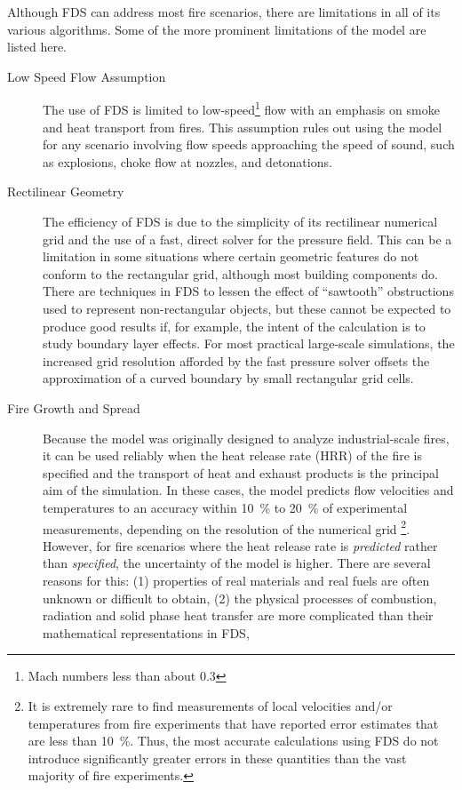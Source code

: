 \documentclass[11pt]{book}
\begin{document}
Although FDS can address most fire scenarios, there are limitations in all of its various algorithms. Some of the more prominent limitations of the
model are listed here. 
\begin{description}
\item[Low Speed Flow Assumption] The use of FDS is limited to low-speed\footnote{Mach numbers less than about 0.3} flow
with an emphasis on smoke and heat transport from fires. This assumption rules out using the model for any scenario involving flow speeds approaching
the speed of sound, such as explosions, choke flow at nozzles, and detonations.
\item[Rectilinear Geometry] The efficiency of FDS is due to the simplicity of its rectilinear numerical grid and the
use of a fast, direct solver for the pressure field. This can be a limitation in some situations where certain geometric features do not conform to
the rectangular grid, although most building components do. There are techniques in FDS to lessen the effect of ``sawtooth'' obstructions used to
represent non-rectangular objects, but these cannot be expected to produce good results if, for example, the intent of the calculation is to study
boundary layer effects. For most practical large-scale simulations, the increased grid resolution afforded by the fast pressure solver offsets the
approximation of a curved boundary by small rectangular grid cells.
\item[Fire Growth and Spread]
Because the model was originally designed to analyze industrial-scale fires, it can be used reliably when the heat release rate (HRR) of the fire is
specified and the transport of heat and exhaust products is the principal aim of the simulation. In these cases, the model predicts flow velocities
and temperatures to an accuracy within 10~\% to 20~\% of experimental measurements, depending on the resolution of the numerical grid \footnote{It is
extremely rare to find measurements of local velocities and/or temperatures from fire experiments that have reported error estimates that are less
than 10~\%. Thus, the most accurate calculations using FDS do not introduce significantly greater errors in these quantities than the vast majority
of fire experiments.}. However, for fire scenarios where the heat release rate is {\em predicted} rather than {\em specified}, the uncertainty of the
model is higher. There are several reasons for this: (1) properties of real materials and real fuels are often unknown or difficult to obtain, (2)
the physical processes of combustion, radiation and solid phase heat transfer are more complicated than their mathematical representations in FDS,

\end{description}
\end{document}
